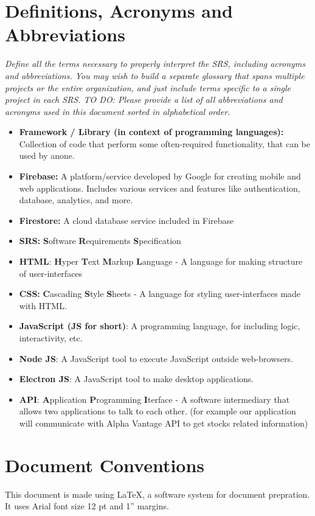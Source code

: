 \documentclass[12 pt, a4paper]{report}
\begin{document}
	\section {Definitions, Acronyms and Abbreviations}
		\textit{Define all the terms necessary to properly interpret the SRS, including acronyms and abbreviations. You may wish to build a separate glossary that spans multiple projects or the entire organization, and just include terms specific to a single project in each SRS. TO DO: Please provide a list of all abbreviations and acronyms used in this document sorted in alphabetical order.}
	\begin{itemize}
		\item \textbf{Framework / Library (in context of programming languages):} Collection of code that perform some often-required functionality, that can be used by anone.
		\item \textbf{Firebase:} A platform/service developed by Google for creating mobile and web applications. Includes various services and features like authentication, database, analytics, and more.
		\item \textbf{Firestore:} A cloud database service included in Firebase
		\item \textbf{SRS:} \textbf{S}oftware \textbf{R}equirements \textbf{S}pecification
		\item \textbf{HTML}: \textbf{H}yper  \textbf{T}ext \textbf{M}arkup \textbf{L}anguage - A language for making structure of user-interfaces
		\item \textbf{CSS:} \textbf{C}ascading \textbf{S}tyle \textbf{S}heets - A language for styling user-interfaces made with HTML.
		\item \textbf{JavaScript (JS for short)}: A programming language, for including logic, interactivity, etc.
		\item \textbf{Node JS}: A JavaScript tool to execute JavaScript outside web-browsers.
		\item \textbf{Electron JS}: A JavaScript tool to make desktop applications.
		\item \textbf{API}: \textbf{A}pplication \textbf{P}rogramming \textbf{I}terface - A software intermediary that allows two applications to talk to each other. (for example our application will communicate with Alpha Vantage API to get stocks related information)
		
	\end{itemize}
	
	
	\section {Document Conventions}
	This document is made using LaTeX, a software system for document prepration. It uses Arial font size 12 pt and 1” margins.
	
\end{document}
